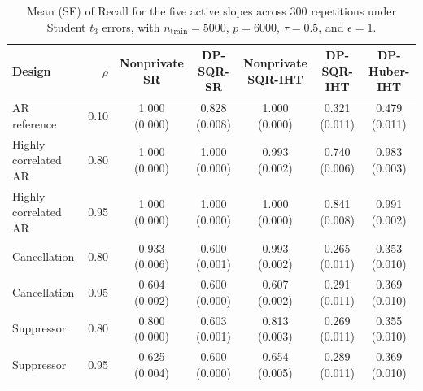 \begin{table}[!tb]
\centering\footnotesize
\setlength{\tabcolsep}{2.5pt}
\caption{Mean (SE) of Recall for the five active slopes across 300
repetitions under Student $t_3$ errors, with $n_{\mathrm{train}}=5000$,
$p=6000$, $\tau=0.5$, and $\epsilon=1$.}
\label{tab:supp-screening-stress}
\begin{tabular}{@{}lrccccc@{}}
\toprule
Design & $\rho$ & \shortstack{Nonprivate\\SR} & DP-SQR-SR & \shortstack{Nonprivate\\SQR-IHT} & DP-SQR-IHT & DP-Huber-IHT\\
\midrule
AR reference & 0.10 & 1.000 (0.000) & 0.828 (0.008) & 1.000 (0.000) & 0.321 (0.011) & 0.479 (0.011) \\
Highly correlated AR & 0.80 & 1.000 (0.000) & 1.000 (0.000) & 0.993 (0.002) & 0.740 (0.006) & 0.983 (0.003) \\
Highly correlated AR & 0.95 & 1.000 (0.000) & 1.000 (0.000) & 1.000 (0.000) & 0.841 (0.008) & 0.991 (0.002) \\
Cancellation & 0.80 & 0.933 (0.006) & 0.600 (0.001) & 0.993 (0.002) & 0.265 (0.011) & 0.353 (0.010) \\
Cancellation & 0.95 & 0.604 (0.002) & 0.600 (0.000) & 0.607 (0.002) & 0.291 (0.011) & 0.369 (0.010) \\
Suppressor & 0.80 & 0.800 (0.000) & 0.603 (0.001) & 0.813 (0.003) & 0.269 (0.011) & 0.355 (0.010) \\
Suppressor & 0.95 & 0.625 (0.004) & 0.600 (0.000) & 0.654 (0.005) & 0.289 (0.011) & 0.369 (0.010) \\
\bottomrule
\end{tabular}
\end{table}
